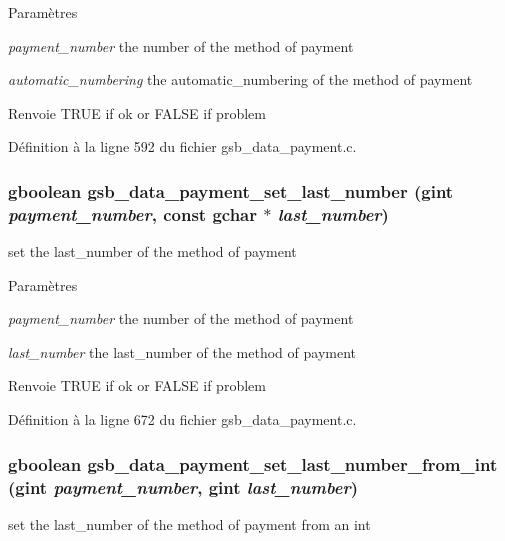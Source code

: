\begin{DoxyParams}{Paramètres}
\item[{\em payment\_\-number}]the number of the method of payment \item[{\em automatic\_\-numbering}]the automatic\_\-numbering of the method of payment\end{DoxyParams}
\begin{DoxyReturn}{Renvoie}
TRUE if ok or FALSE if problem 
\end{DoxyReturn}


Définition à la ligne 592 du fichier gsb\_\-data\_\-payment.c.

\subsubsection[{gsb\_\-data\_\-payment\_\-set\_\-last\_\-number}]{\setlength{\rightskip}{0pt plus 5cm}gboolean gsb\_\-data\_\-payment\_\-set\_\-last\_\-number (gint {\em payment\_\-number}, \/  const gchar $\ast$ {\em last\_\-number})}\label{gsb__data__payment_8c_a7f9e29b9c638bee6d6a848e8f6968a1e}
set the last\_\-number of the method of payment


\begin{DoxyParams}{Paramètres}
\item[{\em payment\_\-number}]the number of the method of payment \item[{\em last\_\-number}]the last\_\-number of the method of payment\end{DoxyParams}
\begin{DoxyReturn}{Renvoie}
TRUE if ok or FALSE if problem 
\end{DoxyReturn}


Définition à la ligne 672 du fichier gsb\_\-data\_\-payment.c.

\subsubsection[{gsb\_\-data\_\-payment\_\-set\_\-last\_\-number\_\-from\_\-int}]{\setlength{\rightskip}{0pt plus 5cm}gboolean gsb\_\-data\_\-payment\_\-set\_\-last\_\-number\_\-from\_\-int (gint {\em payment\_\-number}, \/  gint {\em last\_\-number})}\label{gsb__data__payment_8c_aa96739efe92d5ba723d24e45ef9f9f6a}
set the last\_\-number of the method of payment from an int


